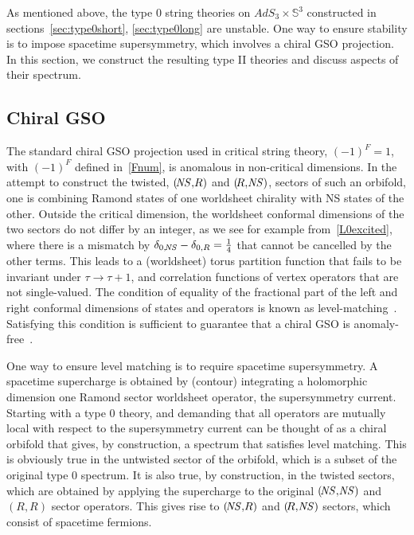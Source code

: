 \documentclass[12pt]{article}
\def\NS{{\it \!NS}}
\newcommand{\bS}{{\mathbb S}}
\numberwithin{equation}{section}
\begin{document}
As mentioned above, the type 0 string theories on $AdS_3\times\bS^3$ constructed in sections~\ref{sec:type0short}, \ref{sec:type0long} are unstable. One way to ensure stability is to impose spacetime supersymmetry, which involves a chiral GSO projection.  In this section, we construct the resulting type II theories and discuss aspects of their spectrum.




\subsection{Chiral GSO}
\label{sec:chiralGSO}

The standard chiral GSO projection used in critical string theory, $(-1)^F=1$, with $(-1)^F$ defined in~\eqref{Fnum}, is anomalous in non-critical dimensions.  In the attempt to construct the twisted, $(\NS,\!R)$ and $(\!R,\NS)$, sectors of such an orbifold, one is combining Ramond states of one worldsheet chirality with NS states of the other. Outside the critical dimension, the worldsheet conformal dimensions of the two sectors do not differ by an integer, as we see for example from~\eqref{L0excited}, where there is a mismatch by $\delta_{0,\NS}-\delta_{0,R}=\frac14$ that cannot be cancelled by the other terms. This leads to a (worldsheet) torus partition function that fails to be invariant under $\tau\to\tau+1$, and correlation functions of vertex operators that are not single-valued. The condition of equality of the fractional part of the left and right conformal dimensions of states and operators is known as level-matching~. Satisfying this condition is sufficient to guarantee that a chiral GSO is anomaly-free~. 

One way to ensure level matching is to require spacetime supersymmetry. A spacetime supercharge is obtained by (contour) integrating a holomorphic dimension one Ramond sector worldsheet operator, the supersymmetry current. Starting with a type 0 theory, and demanding that all operators are mutually local with respect to the supersymmetry current can be thought of as a chiral orbifold that gives, by construction, a spectrum that satisfies level matching. This is obviously true in the untwisted sector of the orbifold, which is a subset of the original type 0 spectrum. It is also true, by construction, in the twisted sectors, which are obtained by applying the supercharge to the original $(\NS,\NS)$ and $(\!R,\!R)$ sector operators. This gives rise to $(\NS,\!R)$ and $(\!R,\NS)$ sectors, which consist of spacetime fermions. 
\end{document}
